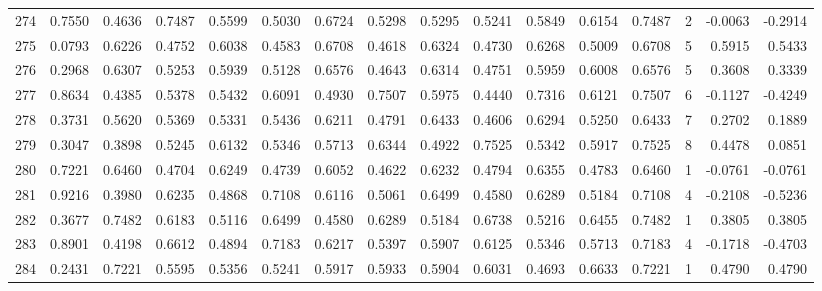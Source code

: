 \begin{tabular}{lrrrrrrrrrrrrrrr}
274 &      0.7550 &  0.4636 &  0.7487 &  0.5599 &  0.5030 &  0.6724 &  0.5298 &  0.5295 &  0.5241 &  0.5849 &   0.6154 &     0.7487 &      2 &                   -0.0063 &                    -0.2914 \\
275 &      0.0793 &  0.6226 &  0.4752 &  0.6038 &  0.4583 &  0.6708 &  0.4618 &  0.6324 &  0.4730 &  0.6268 &   0.5009 &     0.6708 &      5 &                    0.5915 &                     0.5433 \\
276 &      0.2968 &  0.6307 &  0.5253 &  0.5939 &  0.5128 &  0.6576 &  0.4643 &  0.6314 &  0.4751 &  0.5959 &   0.6008 &     0.6576 &      5 &                    0.3608 &                     0.3339 \\
277 &      0.8634 &  0.4385 &  0.5378 &  0.5432 &  0.6091 &  0.4930 &  0.7507 &  0.5975 &  0.4440 &  0.7316 &   0.6121 &     0.7507 &      6 &                   -0.1127 &                    -0.4249 \\
278 &      0.3731 &  0.5620 &  0.5369 &  0.5331 &  0.5436 &  0.6211 &  0.4791 &  0.6433 &  0.4606 &  0.6294 &   0.5250 &     0.6433 &      7 &                    0.2702 &                     0.1889 \\
279 &      0.3047 &  0.3898 &  0.5245 &  0.6132 &  0.5346 &  0.5713 &  0.6344 &  0.4922 &  0.7525 &  0.5342 &   0.5917 &     0.7525 &      8 &                    0.4478 &                     0.0851 \\
280 &      0.7221 &  0.6460 &  0.4704 &  0.6249 &  0.4739 &  0.6052 &  0.4622 &  0.6232 &  0.4794 &  0.6355 &   0.4783 &     0.6460 &      1 &                   -0.0761 &                    -0.0761 \\
281 &      0.9216 &  0.3980 &  0.6235 &  0.4868 &  0.7108 &  0.6116 &  0.5061 &  0.6499 &  0.4580 &  0.6289 &   0.5184 &     0.7108 &      4 &                   -0.2108 &                    -0.5236 \\
282 &      0.3677 &  0.7482 &  0.6183 &  0.5116 &  0.6499 &  0.4580 &  0.6289 &  0.5184 &  0.6738 &  0.5216 &   0.6455 &     0.7482 &      1 &                    0.3805 &                     0.3805 \\
283 &      0.8901 &  0.4198 &  0.6612 &  0.4894 &  0.7183 &  0.6217 &  0.5397 &  0.5907 &  0.6125 &  0.5346 &   0.5713 &     0.7183 &      4 &                   -0.1718 &                    -0.4703 \\
284 &      0.2431 &  0.7221 &  0.5595 &  0.5356 &  0.5241 &  0.5917 &  0.5933 &  0.5904 &  0.6031 &  0.4693 &   0.6633 &     0.7221 &      1 &                    0.4790 &                     0.4790 \\

\end{tabular}
